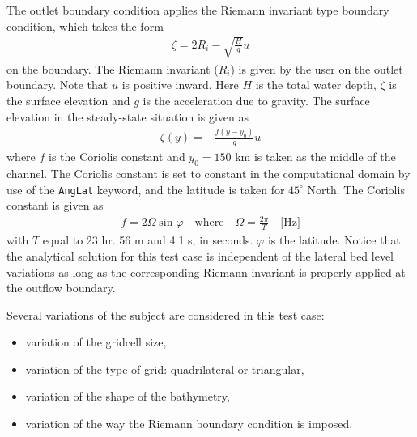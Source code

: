 The outlet boundary condition applies the Riemann invariant type boundary condition, which takes the form
\begin{align}
\zeta = 2R_i - \sqrt{\frac{H}{g}}u 
\end{align}
on the boundary. The Riemann invariant ($R_i$) is given by the user on the outlet boundary. Note that $u$ is positive inward. Here $H$ is the total water depth, $\zeta$ is the surface elevation and $g$ is the acceleration due to gravity. The surface elevation in the steady-state situation is given as
\begin{align}
\zeta(y) = -\frac{f(y - y_0)}{g}u\label{eq:steadyZeta}
\end{align}
where $f$ is the Coriolis constant and $y_0=150$ km is taken as the middle of the channel. The Coriolis constant is set to constant in the computational domain by use of the \texttt{AngLat} keyword, and the latitude is taken for $45^\circ$ North. The Coriolis constant is given as
\begin{align}
f = 2\Omega\sin\varphi\quad\text{where}\quad \Omega = \frac{2\pi}{T}\quad\text{[Hz]}
\end{align}
with $T$ equal to 23 hr. 56 m and 4.1 s, in seconds. $\varphi$ is the latitude. Notice that the analytical solution for this test case is independent of the lateral bed level variations as long as the corresponding Riemann invariant is properly applied at the outflow boundary. 

Several variations of the subject are considered in this test case:
\begin{itemize}
\item variation of the gridcell size,
\item variation of the type of grid: quadrilateral or triangular,
\item variation of the shape of the bathymetry,
\item variation of the way the Riemann boundary condition is imposed.
\end{itemize}


